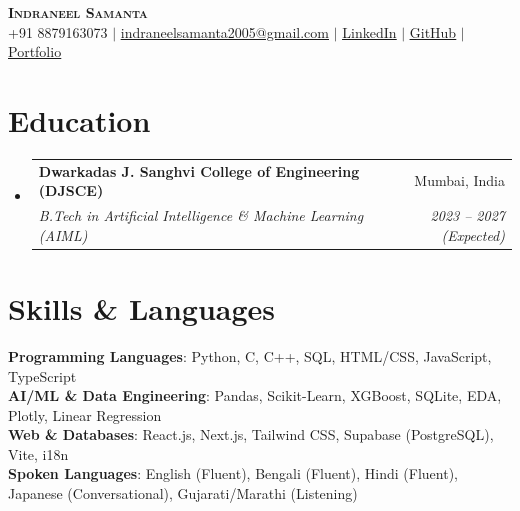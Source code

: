 \documentclass[letterpaper,10pt]{article}
\makeatletter
\newcommand{\resumeSubheading}[4]{
  \item
    \begin{tabular*}{0.98\textwidth}[t]{l@{\extracolsep{\fill}}r}
      \textbf{#1} & \small#2 \\
      \textit{\small#3} & \textit{\small #4} \\
    \end{tabular*}\vspace{-2pt}
}
\newcommand{\resumeSubHeadingListStart}{\begin{itemize}[leftmargin=0.12in, label={}, itemsep=3pt, parsep=0pt, topsep=2pt]}
\newcommand{\resumeSubHeadingListEnd}{\end{itemize}}
\makeatother
\begin{document}
\begin{center}
    \textbf{\Huge \scshape Indraneel Samanta} \\ \vspace{3pt}
    \small +91 8879163073 $|$ 
    \href{mailto:indraneelsamanta2005@gmail.com}{\underline{indraneelsamanta2005@gmail.com}} $|$ 
    \href{https://linkedin.com/in/indraneel-samanta-724782347}{\underline{LinkedIn}} $|$
    \href{https://github.com/NotCatfish}{\underline{GitHub}} $|$
    \href{https://indraneelsamanta.vercel.app/}{\underline{Portfolio}}
\end{center}
\vspace{-6pt}

\section{Education}
  \resumeSubHeadingListStart
    \resumeSubheading
      {Dwarkadas J. Sanghvi College of Engineering (DJSCE)}{Mumbai, India}
      {B.Tech in Artificial Intelligence \& Machine Learning (AIML)}{2023 -- 2027 (Expected)}
  \resumeSubHeadingListEnd

\section{Skills \& Languages}
 \begin{itemize}[leftmargin=0.12in, label={}, itemsep=2pt, parsep=0pt, topsep=2pt]
    \small{\item{
     \textbf{Programming Languages}{: Python, C, C++, SQL, HTML/CSS, JavaScript, TypeScript} \\[2pt]
     \textbf{AI/ML \& Data Engineering}{: Pandas, Scikit-Learn, XGBoost, SQLite, EDA, Plotly, Linear Regression} \\[2pt]
     \textbf{Web \& Databases}{: React.js, Next.js, Tailwind CSS, Supabase (PostgreSQL), Vite, i18n} \\[2pt]
     \textbf{Spoken Languages}{: English (Fluent), Bengali (Fluent), Hindi (Fluent), Japanese (Conversational), Gujarati/Marathi (Listening)}
    }}
 \end{itemize}

\end{document}

